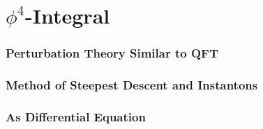 \chapter{$\phi^{4}$-Integral}
\subsection{Perturbation Theory Similar to QFT}

\subsection{Method of Steepest Descent and Instantons}

\subsection{As Differential Equation}
